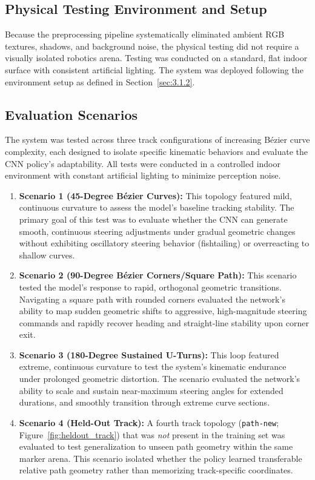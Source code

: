 \subsection{Physical Testing Environment and Setup}

Because the preprocessing pipeline systematically eliminated
ambient RGB textures, shadows, and background noise, the physical testing did not require
a visually isolated robotics arena. Testing was conducted on a standard, flat indoor surface with consistent artificial lighting.
The system was deployed following the environment setup as defined in Section~\ref{sec:3.1.2}.

\subsection{Evaluation Scenarios}
\label{sec:eval_scenarios}

The system was tested across three track configurations of increasing B{\'e}zier curve complexity, each designed to isolate specific kinematic behaviors and evaluate the CNN policy's adaptability. All tests were conducted in a controlled indoor environment with constant artificial lighting to minimize perception noise.

\begin{enumerate}
    \item \textbf{Scenario 1 (45-Degree B{\'e}zier Curves):} This topology featured mild, continuous curvature to assess the model's baseline tracking stability. The primary goal of this test was to evaluate whether the CNN can generate smooth, continuous steering adjustments under gradual geometric changes without exhibiting oscillatory steering behavior (fishtailing) or overreacting to shallow curves.

    \item \textbf{Scenario 2 (90-Degree B{\'e}zier Corners/Square Path):} This scenario tested the model's response to rapid, orthogonal geometric transitions. Navigating a square path with rounded corners evaluated the network's ability to map sudden geometric shifts to aggressive, high-magnitude steering commands and rapidly recover heading and straight-line stability upon corner exit.

    \item \textbf{Scenario 3 (180-Degree Sustained U-Turns):} This loop featured extreme, continuous curvature to test the system's kinematic endurance under prolonged geometric distortion. The scenario evaluated the network's ability to scale and sustain near-maximum steering angles for extended durations, and smoothly transition through extreme curve sections.

    \item \textbf{Scenario 4 (Held-Out Track):} A fourth track topology (\texttt{path-new}; Figure~\ref{fig:heldout_track}) that was \emph{not} present in the training set was evaluated to test generalization to unseen path geometry within the same marker arena. This scenario isolated whether the policy learned transferable relative path geometry rather than memorizing track-specific coordinates.
\end{enumerate}

